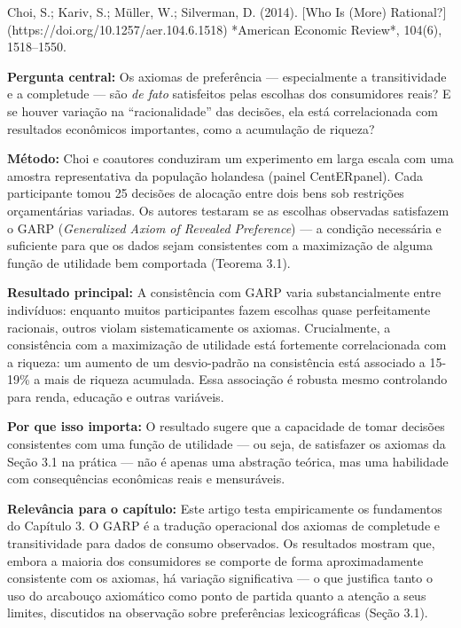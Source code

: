 \documentclass[11pt,twoside,openright]{book}
\begin{document}
\begin{pesquisabox}{Choi, S.; Kariv, S.; Müller, W.; Silverman, D. (2014). [Who Is (More) Rational?](https://doi.org/10.1257/aer.104.6.1518) *American Economic Review*, 104(6), 1518–1550.}

\textbf{Pergunta central:} Os axiomas de preferência --- especialmente a
transitividade e a completude --- são \emph{de fato} satisfeitos pelas
escolhas dos consumidores reais? E se houver variação na
``racionalidade'' das decisões, ela está correlacionada com resultados
econômicos importantes, como a acumulação de riqueza?

\textbf{Método:} Choi e coautores conduziram um experimento em larga
escala com uma amostra representativa da população holandesa (painel
CentERpanel). Cada participante tomou 25 decisões de alocação entre dois
bens sob restrições orçamentárias variadas. Os autores testaram se as
escolhas observadas satisfazem o GARP (\emph{Generalized Axiom of
Revealed Preference}) --- a condição necessária e suficiente para que os
dados sejam consistentes com a maximização de alguma função de utilidade
bem comportada (Teorema 3.1).

\textbf{Resultado principal:} A consistência com GARP varia
substancialmente entre indivíduos: enquanto muitos participantes fazem
escolhas quase perfeitamente racionais, outros violam sistematicamente
os axiomas. Crucialmente, a consistência com a maximização de utilidade
está fortemente correlacionada com a riqueza: um aumento de um
desvio-padrão na consistência está associado a 15-19\% a mais de riqueza
acumulada. Essa associação é robusta mesmo controlando para renda,
educação e outras variáveis.

\textbf{Por que isso importa:} O resultado sugere que a capacidade de
tomar decisões consistentes com uma função de utilidade --- ou seja, de
satisfazer os axiomas da Seção 3.1 na prática --- não é apenas uma
abstração teórica, mas uma habilidade com consequências econômicas reais
e mensuráveis.

\textbf{Relevância para o capítulo:} Este artigo testa empiricamente os
fundamentos do Capítulo 3. O GARP é a tradução operacional dos axiomas
de completude e transitividade para dados de consumo observados. Os
resultados mostram que, embora a maioria dos consumidores se comporte de
forma aproximadamente consistente com os axiomas, há variação
significativa --- o que justifica tanto o uso do arcabouço axiomático
como ponto de partida quanto a atenção a seus limites, discutidos na
observação sobre preferências lexicográficas (Seção 3.1).

\end{pesquisabox}
\end{document}
